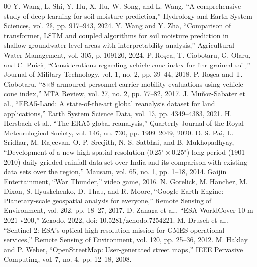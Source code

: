 \documentclass[conference]{IEEEtran}
\begin{document}
\begin{thebibliography}{00}
 Y. Wang, L. Shi, Y. Hu, X. Hu, W. Song, and L. Wang, ``A comprehensive study of deep learning for soil moisture prediction,'' Hydrology and Earth System Sciences, vol. 28, pp. 917--943, 2024.
 Y. Wang and Y. Zha, ``Comparison of transformer, LSTM and coupled algorithms for soil moisture prediction in shallow-groundwater-level areas with interpretability analysis,'' Agricultural Water Management, vol. 305, p. 109120, 2024.
 P. Ro\c{s}ca, T. Ciobotaru, G. Olaru, and C. Puic\u{a}, ``Considerations regarding vehicle cone index for fine-grained soil,'' Journal of Military Technology, vol. 1, no. 2, pp. 39--44, 2018.
 P. Ro\c{s}ca and T. Ciobotaru, ``8$\times$8 armoured personnel carrier mobility evaluations using vehicle cone index,'' MTA Review, vol. 27, no. 2, pp. 77--82, 2017.
 J. Mu\~{n}oz-Sabater et al., ``ERA5-Land: A state-of-the-art global reanalysis dataset for land applications,'' Earth System Science Data, vol. 13, pp. 4349--4383, 2021.
 H. Hersbach et al., ``The ERA5 global reanalysis,'' Quarterly Journal of the Royal Meteorological Society, vol. 146, no. 730, pp. 1999--2049, 2020.
 D. S. Pai, L. Sridhar, M. Rajeevan, O. P. Sreejith, N. S. Satbhai, and B. Mukhopadhyay, ``Development of a new high spatial resolution (0.25$^\circ\times$0.25$^\circ$) long period (1901--2010) daily gridded rainfall data set over India and its comparison with existing data sets over the region,'' Mausam, vol. 65, no. 1, pp. 1--18, 2014.
 Gaijin Entertainment, ``War Thunder,'' video game, 2016.
 N. Gorelick, M. Hancher, M. Dixon, S. Ilyushchenko, D. Thau, and R. Moore, ``Google Earth Engine: Planetary-scale geospatial analysis for everyone,'' Remote Sensing of Environment, vol. 202, pp. 18--27, 2017.
 D. Zanaga et al., ``ESA WorldCover 10 m 2021 v200,'' Zenodo, 2022, doi: 10.5281/zenodo.7254221.
 M. Drusch et al., ``Sentinel-2: ESA's optical high-resolution mission for GMES operational services,'' Remote Sensing of Environment, vol. 120, pp. 25--36, 2012.
 M. Haklay and P. Weber, ``OpenStreetMap: User-generated street maps,'' IEEE Pervasive Computing, vol. 7, no. 4, pp. 12--18, 2008.
\end{thebibliography}
\end{document}
